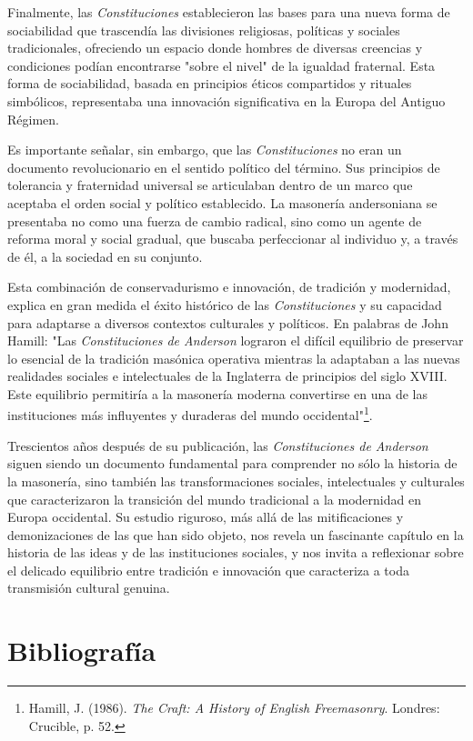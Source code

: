 \documentclass[a4paper,12pt,twoside]{book}
\begin{document}
Finalmente, las \textit{Constituciones} establecieron las bases para una nueva forma de sociabilidad que trascendía las divisiones religiosas, políticas y sociales tradicionales, ofreciendo un espacio donde hombres de diversas creencias y condiciones podían encontrarse "sobre el nivel" de la igualdad fraternal. Esta forma de sociabilidad, basada en principios éticos compartidos y rituales simbólicos, representaba una innovación significativa en la Europa del Antiguo Régimen.

Es importante señalar, sin embargo, que las \textit{Constituciones} no eran un documento revolucionario en el sentido político del término. Sus principios de tolerancia y fraternidad universal se articulaban dentro de un marco que aceptaba el orden social y político establecido. La masonería andersoniana se presentaba no como una fuerza de cambio radical, sino como un agente de reforma moral y social gradual, que buscaba perfeccionar al individuo y, a través de él, a la sociedad en su conjunto.

Esta combinación de conservadurismo e innovación, de tradición y modernidad, explica en gran medida el éxito histórico de las \textit{Constituciones} y su capacidad para adaptarse a diversos contextos culturales y políticos. En palabras de John Hamill: "Las \textit{Constituciones de Anderson} lograron el difícil equilibrio de preservar lo esencial de la tradición masónica operativa mientras la adaptaban a las nuevas realidades sociales e intelectuales de la Inglaterra de principios del siglo XVIII. Este equilibrio permitiría a la masonería moderna convertirse en una de las instituciones más influyentes y duraderas del mundo occidental"\footnote{Hamill, J. (1986). \textit{The Craft: A History of English Freemasonry}. Londres: Crucible, p. 52.}.

Trescientos años después de su publicación, las \textit{Constituciones de Anderson} siguen siendo un documento fundamental para comprender no sólo la historia de la masonería, sino también las transformaciones sociales, intelectuales y culturales que caracterizaron la transición del mundo tradicional a la modernidad en Europa occidental. Su estudio riguroso, más allá de las mitificaciones y demonizaciones de las que han sido objeto, nos revela un fascinante capítulo en la historia de las ideas y de las instituciones sociales, y nos invita a reflexionar sobre el delicado equilibrio entre tradición e innovación que caracteriza a toda transmisión cultural genuina.

\chapter{Bibliografía}
\end{document}
